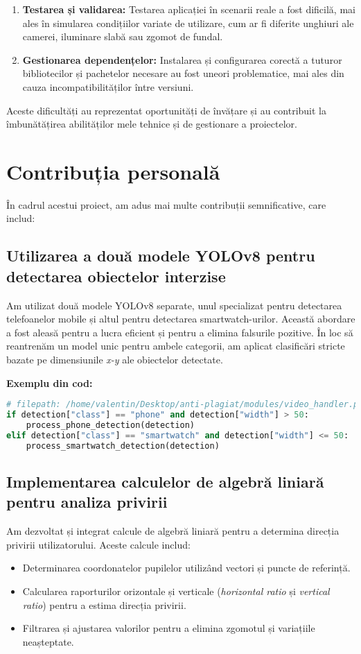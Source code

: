 \documentclass[12pt,a4paper]{article}
\begin{document}
\begin{enumerate}
    \item \textbf{Testarea și validarea:} Testarea aplicației în scenarii reale a fost dificilă, mai ales în simularea condițiilor variate de utilizare, cum ar fi diferite unghiuri ale camerei, iluminare slabă sau zgomot de fundal.

    \item \textbf{Gestionarea dependențelor:} Instalarea și configurarea corectă a tuturor bibliotecilor și pachetelor necesare au fost uneori problematice, mai ales din cauza incompatibilităților între versiuni.
\end{enumerate}

Aceste dificultăți au reprezentat oportunități de învățare și au contribuit la îmbunătățirea abilităților mele tehnice și de gestionare a proiectelor.

\section{Contribuția personală}

În cadrul acestui proiect, am adus mai multe contribuții semnificative, care includ:

\subsection{Utilizarea a două modele YOLOv8 pentru detectarea obiectelor interzise}
Am utilizat două modele YOLOv8 separate, unul specializat pentru detectarea telefoanelor mobile și altul pentru detectarea smartwatch-urilor. Această abordare a fost aleasă pentru a lucra eficient și pentru a elimina falsurile pozitive. În loc să reantrenăm un model unic pentru ambele categorii, am aplicat clasificări stricte bazate pe dimensiunile \textit{x-y} ale obiectelor detectate.

\textbf{Exemplu din cod:}
\begin{lstlisting}[language=Python]
# filepath: /home/valentin/Desktop/anti-plagiat/modules/video_handler.py
if detection["class"] == "phone" and detection["width"] > 50:
    process_phone_detection(detection)
elif detection["class"] == "smartwatch" and detection["width"] <= 50:
    process_smartwatch_detection(detection)
\end{lstlisting}

\subsection{Implementarea calculelor de algebră liniară pentru analiza privirii}
Am dezvoltat și integrat calcule de algebră liniară pentru a determina direcția privirii utilizatorului. Aceste calcule includ:
\begin{itemize}
    \item Determinarea coordonatelor pupilelor utilizând vectori și puncte de referință.
    \item Calcularea raporturilor orizontale și verticale (\textit{horizontal ratio} și \textit{vertical ratio}) pentru a estima direcția privirii.
    \item Filtrarea și ajustarea valorilor pentru a elimina zgomotul și variațiile neașteptate.
\end{itemize}
\end{document}
